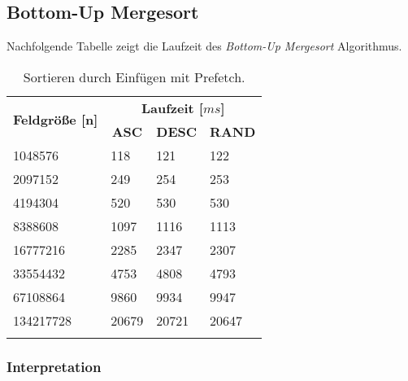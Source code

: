 \subsection{Bottom-Up Mergesort}

Nachfolgende Tabelle zeigt die Laufzeit des \textit{Bottom-Up Mergesort} Algorithmus.

\begin{center}
	\begin{longtable}{|p{5cm}|p{3cm}|p{3cm}|p{3cm}|}
		\hline
		
		\multirow{2}{5cm}{\centering \textbf{Feldgröße [n]}} & \multicolumn{3}{|c|}{ \textbf{Laufzeit [$ms$]}} \\\cline{2-4}
		& \multicolumn{1}{|c|}{\textbf{ASC}} & \multicolumn{1}{|c|}{\textbf{DESC}} &\multicolumn{1}{|c|}{\textbf{RAND}} \\
		\hhline{|=|=|=|=|}
		
		1048576 & 118 & 121 & 122\\
		\hline
		2097152 & 249 & 254 & 253\\
		\hline
		4194304 & 520 & 530 & 530\\
		\hline
		8388608 & 1097 & 1116 & 1113\\
		\hline
		16777216 & 2285 & 2347 & 2307\\
		\hline
		33554432 & 4753 & 4808 & 4793\\
		\hline
		67108864 & 9860 & 9934 & 9947\\
		\hline
		134217728 & 20679 & 20721 & 20647\\
		\hline
		
		\caption{Sortieren durch Einfügen mit Prefetch.}
		\label{tab:insertionsort-v2}
	\end{longtable}
\end{center}

\subsubsection{Interpretation}

